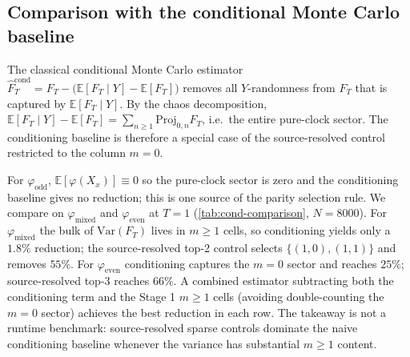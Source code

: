 \documentclass[11pt,reqno]{amsart}
\theoremstyle{plain}
\theoremstyle{definition}
\theoremstyle{remark}
\newcommand{\E}{\mathbb{E}}
\newcommand{\Var}{\mathrm{Var}}
\newcommand{\Proj}{\mathrm{Proj}}
\begin{document}
\subsection{Comparison with the conditional Monte Carlo baseline}
\label{sec:cond-baseline}
The classical conditional Monte Carlo estimator
$\widehat F^{\mathrm{cond}}_T = F_T - \bigl(\E[F_T \mid Y] - \E[F_T]\bigr)$
removes all $Y$-randomness from $F_T$ that is captured by
$\E[F_T \mid Y]$. By the chaos decomposition,
$\E[F_T \mid Y] - \E[F_T] = \sum_{n \ge 1} \Proj_{0, n} F_T$,
i.e.\ the entire pure-clock sector. The conditioning baseline is
therefore a special case of the source-resolved control restricted
to the column $m = 0$.

For $\varphi_{\mathrm{odd}}$, $\E[\varphi(X_x)] \equiv 0$ so the
pure-clock sector is zero and the conditioning baseline gives no
reduction; this is one source of the parity selection rule. We
compare on $\varphi_{\mathrm{mixed}}$ and $\varphi_{\mathrm{even}}$
at $T = 1$ (\cref{tab:cond-comparison}, $N = 8000$). For
$\varphi_{\mathrm{mixed}}$ the bulk of $\Var(F_T)$ lives in $m \ge 1$
cells, so conditioning yields only a $1.8\%$ reduction; the
source-resolved top-2 control selects $\{(1, 0), (1, 1)\}$ and
removes $55\%$. For $\varphi_{\mathrm{even}}$ conditioning captures
the $m = 0$ sector and reaches $25\%$; source-resolved top-3 reaches
$66\%$. A combined estimator subtracting both the conditioning term
and the Stage 1 $m \ge 1$ cells (avoiding double-counting the
$m = 0$ sector) achieves the best reduction in each row. The
takeaway is not a runtime benchmark: source-resolved sparse
controls dominate the naive conditioning baseline whenever the
variance has substantial $m \ge 1$ content.
\end{document}

